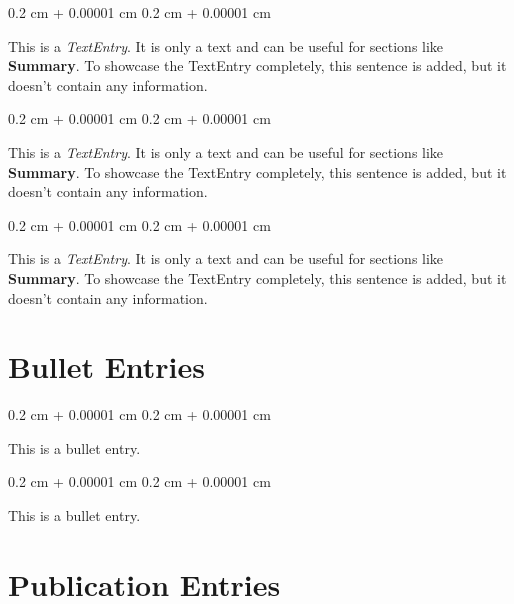\documentclass[10pt, letterpaper]{article}
\newenvironment{onecolentry}{
    \begin{adjustwidth}{
        0.2 cm + 0.00001 cm
    }{
        0.2 cm + 0.00001 cm
    }
}{
    \end{adjustwidth}
} %
\begin{document}
        
        \begin{onecolentry}
            This is a \textit{TextEntry}. It is only a text and can be useful for sections like \textbf{Summary}. To showcase the TextEntry completely, this sentence is added, but it doesn't contain any information.
        \end{onecolentry}

        \vspace{0.2 cm}

        \begin{onecolentry}
            This is a \textit{TextEntry}. It is only a text and can be useful for sections like \textbf{Summary}. To showcase the TextEntry completely, this sentence is added, but it doesn't contain any information.
        \end{onecolentry}

        \vspace{0.2 cm}

        \begin{onecolentry}
            This is a \textit{TextEntry}. It is only a text and can be useful for sections like \textbf{Summary}. To showcase the TextEntry completely, this sentence is added, but it doesn't contain any information.
        \end{onecolentry}


    
    \section{Bullet Entries}

        
        \begin{onecolentry}
            \textbullet \hspace{3pt} This is a bullet entry.
        \end{onecolentry}

        \vspace{0.2 cm}

        \begin{onecolentry}
            \textbullet \hspace{3pt} This is a bullet entry.
        \end{onecolentry}


    
    \section{Publication Entries}
\end{document}
